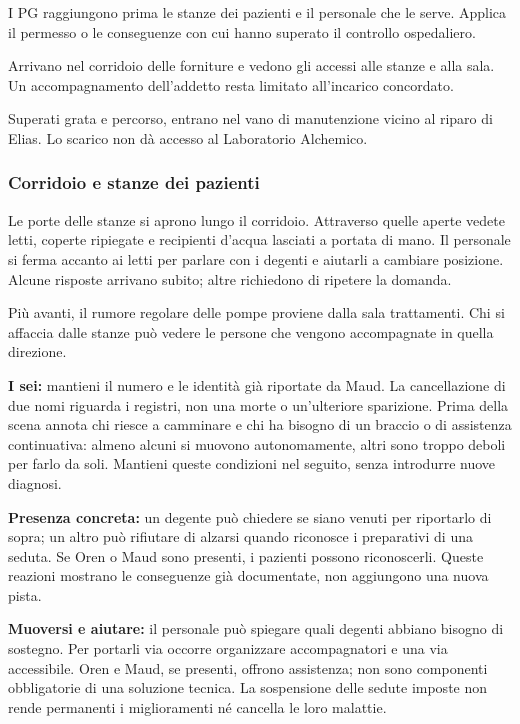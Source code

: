 \documentclass[11pt,a4paper]{article}
\begin{document}
\begin{description}[leftmargin=5mm,style=nextline]
\item[Dalla scala.] I PG raggiungono prima le stanze dei pazienti e il personale che le serve. Applica il permesso o le conseguenze con cui hanno superato il controllo ospedaliero.
\item[Dalla galleria.] Arrivano nel corridoio delle forniture e vedono gli accessi alle stanze e alla sala. Un accompagnamento dell'addetto resta limitato all'incarico concordato.
\item[Dallo scarico.] Superati grata e percorso, entrano nel vano di manutenzione vicino al riparo di Elias. Lo scarico non dà accesso al Laboratorio Alchemico.
\end{description}

\subsubsection{Corridoio e stanze dei pazienti}
\begin{readaloud}
Le porte delle stanze si aprono lungo il corridoio. Attraverso quelle aperte vedete letti, coperte ripiegate e recipienti d'acqua lasciati a portata di mano. Il personale si ferma accanto ai letti per parlare con i degenti e aiutarli a cambiare posizione. Alcune risposte arrivano subito; altre richiedono di ripetere la domanda.

Più avanti, il rumore regolare delle pompe proviene dalla sala trattamenti. Chi si affaccia dalle stanze può vedere le persone che vengono accompagnate in quella direzione.
\end{readaloud}

\textbf{I sei:} mantieni il numero e le identità già riportate da Maud. La cancellazione di due nomi riguarda i registri, non una morte o un'ulteriore sparizione. Prima della scena annota chi riesce a camminare e chi ha bisogno di un braccio o di assistenza continuativa: almeno alcuni si muovono autonomamente, altri sono troppo deboli per farlo da soli. Mantieni queste condizioni nel seguito, senza introdurre nuove diagnosi.

\textbf{Presenza concreta:} un degente può chiedere se siano venuti per riportarlo di sopra; un altro può rifiutare di alzarsi quando riconosce i preparativi di una seduta. Se Oren o Maud sono presenti, i pazienti possono riconoscerli. Queste reazioni mostrano le conseguenze già documentate, non aggiungono una nuova pista.

\textbf{Muoversi e aiutare:} il personale può spiegare quali degenti abbiano bisogno di sostegno. Per portarli via occorre organizzare accompagnatori e una via accessibile. Oren e Maud, se presenti, offrono assistenza; non sono componenti obbligatorie di una soluzione tecnica. La sospensione delle sedute imposte non rende permanenti i miglioramenti né cancella le loro malattie.
\end{document}
